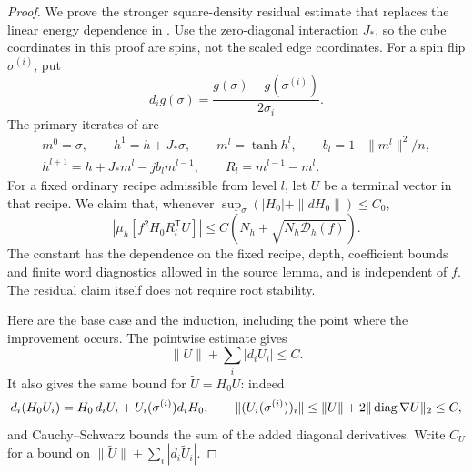 \begin{proof}
We prove the stronger square-density residual estimate that replaces
the linear energy dependence in \cite[Lemma~6.5]{SG}.  Use the
zero-diagonal interaction \(J_*\), so the cube coordinates in this
proof are spins, not the scaled edge coordinates.  For a spin flip
\(\sigma^{(i)}\), put
\[
 d_i g(\sigma)=\frac{g(\sigma)-g(\sigma^{(i)})}{2\sigma_i}.
\]
The primary iterates of \cite[Section~6]{SG} are
\[
\begin{gathered}
 m^0=\sigma,\qquad h^1=h+J_*\sigma,\qquad
 m^l=\tanh h^l,\qquad b_l=1-\|m^l\|^2/n,\\
 h^{l+1}=h+J_*m^l-jb_lm^{l-1},\qquad
 R_l=m^{l-1}-m^l .
\end{gathered}
\]
For a fixed ordinary recipe admissible from level \(l\), let \(U\)
be a terminal vector in that recipe.  We claim that, whenever
\(\sup_\sigma(|H_0|+\|dH_0\|)\le C_0\),
\begin{equation}
 \left|\mu_h[f^2H_0R_l^{\mathsf T}U]\right|
 \le C\left(N_h+\sqrt{N_h\mathcal D_h(f)}\right).
                                                               \label{warm:sqrt-residual}
\end{equation}
The constant has the dependence on the fixed recipe, depth, coefficient
bounds and finite word diagnostics allowed in the source lemma, and
is independent of \(f\).  The residual claim itself does not require
root stability.

Here are the base case and the induction, including the point where
the improvement occurs.  The pointwise estimate
\cite[Lemma~6.4, Equation~(6.20)]{SG} gives
\[
 \|U\|+\sum_i|d_iU_i|\le C .
\]
It also gives the same bound for
\(\widetilde U=H_0U\): indeed
\[
 d_i(H_0U_i)=H_0\,d_iU_i+U_i(\sigma^{(i)})d_iH_0,
 \qquad
 \|(U_i(\sigma^{(i)}))_i\|
       \le\|U\|+2\|\operatorname{diag}\nabla U\|_2\le C,
\]
and Cauchy--Schwarz bounds the sum of the added diagonal derivatives.
Write \(C_U\) for a bound on
\(\|\widetilde U\|+\sum_i|d_i\widetilde U_i|\).


\end{proof}
